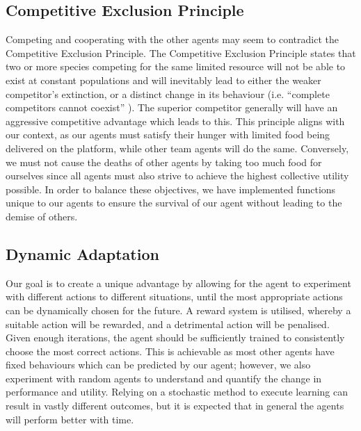 \subsection{Competitive Exclusion Principle}
Competing and cooperating with the other agents may seem to contradict the Competitive Exclusion Principle. The Competitive Exclusion Principle states that two or more species competing for the same limited resource will not be able to exist at constant populations and will inevitably lead to either the weaker competitor’s extinction, or a distinct change in its behaviour (i.e. “complete competitors cannot coexist” \cite{HardinGarrett1960TCEP}). The superior competitor generally will have an aggressive competitive advantage which leads to this. This principle aligns with our context, as our agents must satisfy their hunger with limited food being delivered on the platform, while other team agents will do the same. Conversely, we must not cause the deaths of other agents by taking too much food for ourselves since all agents must also strive to achieve the highest collective utility possible. In order to balance these objectives, we have implemented functions unique to our agents to ensure the survival of our agent without leading to the demise of others.  

\subsection{Dynamic Adaptation}
Our goal is to create a unique advantage by allowing for the agent to experiment with different actions to different situations, until the most appropriate actions can be dynamically chosen for the future. A reward system is utilised, whereby a suitable action will be rewarded, and a detrimental action will be penalised. Given enough iterations, the agent should be sufficiently trained to consistently choose the most correct actions. This is achievable as most other agents have fixed behaviours which can be predicted by our agent; however, we also experiment with random agents to understand and quantify the change in performance and utility. Relying on a stochastic method to execute learning can result in vastly different outcomes, but it is expected that in general the agents will perform better with time.
